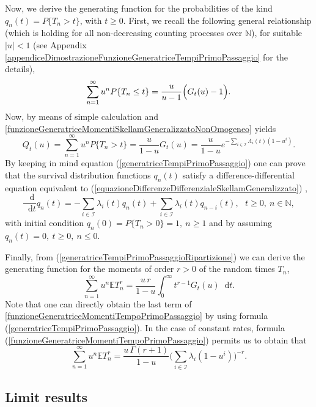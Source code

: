 \documentclass[12pt, twoside, english, headsepline]{article}
\newcommand*\dif{\mathop{}\!\mathrm{d}}  %
\theoremstyle{definition} %
\numberwithin{equation}{section} %
\begin{document}
Now, we derive the generating function for the probabilities of the kind $q_n(t) = P\{T_n > t\}$, with $t\ge0$. First, we recall the following general relationship (which is holding for all non-decreasing counting processes over $\mathbb{N}$), for suitable $|u|< 1$ (see Appendix \ref{appendiceDimostrazioneFunzioneGeneratriceTempiPrimoPassaggio} for the details),
\begin{equation}\label{generatriceTempiPrimoPassaggioRipartizione}
	\sum_{n=1}^\infty u^n P\{T_n \le t \} = \frac{u}{u-1}\Bigl(G_t(u) - 1\Bigr).
\end{equation}
Now, by means of simple calculation and \eqref{funzioneGeneratriceMomentiSkellamGeneralizzatoNonOmogeneo} yields
\begin{equation}\label{generatriceTempiPrimoPassaggio}
Q_t(u) = \sum_{n=1}^\infty u^n P\{T_n > t \} = \frac{u}{1-u}G_t(u)= \frac{u}{1-u} e^{-\sum_{i\in\mathcal{I}} \Lambda_i(t) (1-u^i)}.
\end{equation}
By keeping in mind equation (\ref{generatriceTempiPrimoPassaggio}) one can prove that the survival distribution functions $q_n(t)$ satisfy a difference-differential equation equivalent to (\ref{equazioneDifferenzeDifferenzialeSkellamGeneralizzato}) ,
\begin{equation*}
\frac{\dif }{\dif t}q_n(t) = -\sum_{i\in\mathcal{I}} \lambda_i(t) q_n(t) + \sum_{i\in\mathcal{I}} \lambda_i(t) q_{n-i}(t),\ \ \ t\ge0,\ n\in\mathbb{N},
\end{equation*}
with initial condition $q_n(0) = P\{T_n>0\} = 1, \ n\ge1$ and by assuming $q_n(t)=0,\ t\ge0,\ n\le0$.

Finally, from (\ref{generatriceTempiPrimoPassaggioRipartizione}) we can derive the generating function for the moments of order $r>0$ of the random times $T_n$,
\begin{equation}\label{funzioneGeneratriceMomentiTempoPrimoPassaggio}
\sum_{n=1}^\infty u^n \mathbb{E} T^r_n = \frac{u\,r}{1-u}\int_0^\infty t^{r-1}G_t(u)\dif t.
\end{equation}
Note that one can directly obtain the last term of \eqref{funzioneGeneratriceMomentiTempoPrimoPassaggio} by using formula (\ref{generatriceTempiPrimoPassaggio}). In the case of constant rates, formula (\ref{funzioneGeneratriceMomentiTempoPrimoPassaggio}) permits us to obtain that
$$ \sum_{n=1}^\infty u^n \mathbb{E} T^r_n  = \frac{u\,\Gamma(r+1)}{1-u}\Biggl(\sum_{i\in\mathcal{I}} \lambda_i(1-u^i)\Biggr)^{-r}.$$




\subsection{Limit results}\label{sezioneLimiti}
\end{document}

